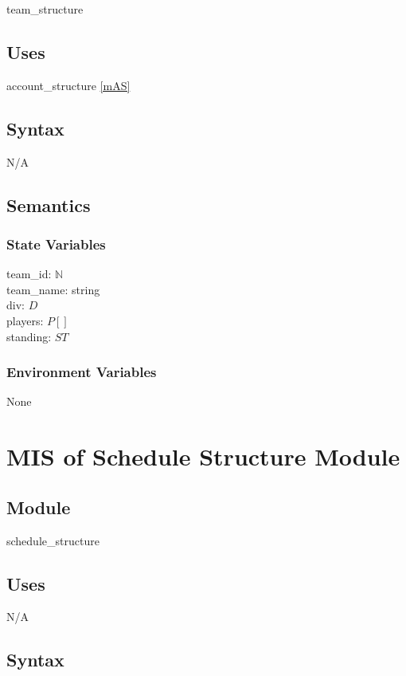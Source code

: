 \documentclass[12pt, titlepage]{article}
\begin{document}
team\_structure

\subsection{Uses}

account\_structure \ref{mAS}

\subsection{Syntax}

N/A

\subsection{Semantics}

\subsubsection{State Variables}

team\_id: $\mathbb{N}$\\
team\_name: string\\
div: $D$\\
players: $P[]$\\
standing: $ST$

\subsubsection{Environment Variables}

None

\newpage

\section{MIS of Schedule Structure Module} \label{mSS}

\subsection{Module}

schedule\_structure

\subsection{Uses}

N/A

\subsection{Syntax}
\end{document}
